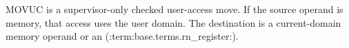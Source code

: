 MOVUC is a supervisor-only checked user-access move. If the source operand is memory, that access uses the user domain. The destination is a current-domain memory operand or an (:term:base.terms.rn_register:).
